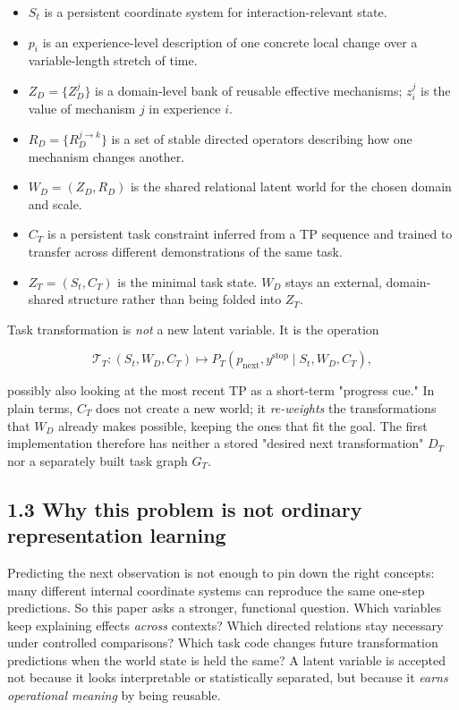 \documentclass[11pt]{article}
\begin{document}
\begin{itemize}
\item $S_t$ is a persistent coordinate system for interaction-relevant state.
\item $p_i$ is an experience-level description of one concrete local change over a variable-length stretch of time.
\item $Z_D=\{Z_D^j\}$ is a domain-level bank of reusable effective mechanisms; $z_i^j$ is the value of mechanism $j$ in experience $i$.
\item $R_D=\{R_D^{j\rightarrow k}\}$ is a set of stable directed operators describing how one mechanism changes another.
\item $W_D=(Z_D,R_D)$ is the shared relational latent world for the chosen domain and scale.
\item $C_T$ is a persistent task constraint inferred from a TP sequence and trained to transfer across different demonstrations of the same task.
\item $Z_T=(S_t,C_T)$ is the minimal task state. $W_D$ stays an external, domain-shared structure rather than being folded into $Z_T$.
\end{itemize}

Task transformation is \emph{not} a new latent variable. It is the operation

\[
\boxed{
\mathcal T_T:(S_t,W_D,C_T)\longmapsto
P_T(p_{\mathrm{next}},y^{\mathrm{stop}}\mid S_t,W_D,C_T),}
\]

possibly also looking at the most recent TP as a short-term "progress cue." In plain terms, $C_T$ does not create a new world; it
\emph{re-weights} the transformations that $W_D$ already makes possible, keeping the ones that fit the goal. The first
implementation therefore has neither a stored "desired next transformation" $D_T$ nor a separately built task graph $G_T$.

\subsection*{1.3 Why this problem is not ordinary representation learning}

Predicting the next observation is not enough to pin down the right concepts: many different internal coordinate systems can
reproduce the same one-step predictions. So this paper asks a stronger, functional question. Which variables keep explaining
effects \emph{across} contexts? Which directed relations stay necessary under controlled comparisons? Which task code changes
future transformation predictions when the world state is held the same? A latent variable is accepted not because it looks
interpretable or statistically separated, but because it \emph{earns operational meaning} by being reusable.
\end{document}
